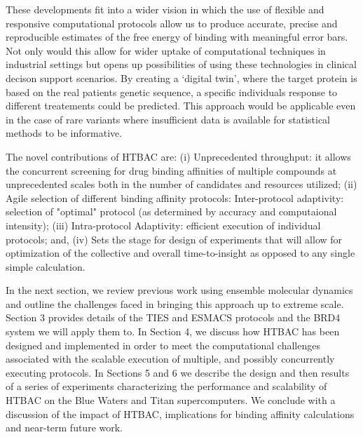 
These developments fit into a wider vision in which the use of
flexible and responsive computational protocols allow us to produce accurate,
precise and reproducible estimates of the free energy of binding with meaningful error bars. Not only
would this allow for wider uptake of computational techniques in industrial
settings but opens up possibilities of using these technologies in clinical
decison support scenarios. By creating a `digital twin', where the target
protein is based on the real patients genetic sequence, a specific individuals
response to different treatements could be predicted. This approach would be
applicable even in the case of rare variants where insufficient data is
available for statistical methods to be informative.

The novel contributions of HTBAC are: (i) Unprecedented throughput: it allows
the concurrent screening for drug binding affinities of multiple compounds at
unprecedented scales both in the number of candidates and resources utilized;
(ii) Agile selection of different binding affinity protocols: Inter-protocol
adaptivity: selection of "optimal" protocol (as determined by accuracy and
computaional intensity); (iii) Intra-protocol Adaptivity: efficient execution
of individual protocols; and, (iv) Sets the stage for design of experiments
that will allow for optimization of the collective and overall  
time-to-insight as opposed to any single simple calculation.

In the next section, we review previous work using ensemble molecular dynamics
and outline the challenges faced in bringing this approach up to extreme
scale. Section 3 provides details of the TIES and ESMACS protocols and the
BRD4 system we will apply them to. In Section 4, we discuss how HTBAC has
been designed and implemented in order to meet the computational challenges
associated with the scalable execution of multiple, and possibly concurrently
executing protocols. In Sections 5 and 6 we describe the design and then
results of a series of experiments characterizing the performance and
scalability of HTBAC on the Blue Waters and Titan supercomputers. We conclude
with a discussion of the impact of HTBAC, implications for binding affinity
calculations and near-term future work.
